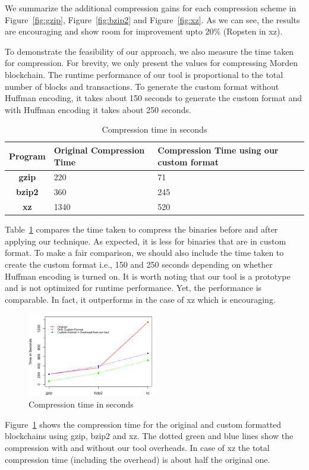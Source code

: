 We summarize the additional compression gains for each compression scheme in Figure~\ref{fig:gzip}, Figure~\ref{fig:bzip2} and Figure~\ref{fig:xz}. 
As we can see, the results are encouraging and show room for improvement upto $20\%$ (Ropsten in xz).

To demonstrate the feasibility of our approach, we also measure the time taken for compression. 
For brevity, we only present the values for compressing Morden blockchain.
The runtime performance of our tool is proportional to the total number of blocks and transactions. 
To generate the custom format without Huffman encoding, it takes about 150 seconds to generate the custom format and with Huffman encoding it takes about 250 seconds. 



\begin{table}[H]
	\centering
	\begin{tabular}{>{\bfseries}c | p{3cm} | p{3cm}} 
	Program & {Original Compression Time} & {Compression Time using our custom format} \\
	\hline
	gzip & 220  & 71 \\
	bzip2 & 360  & 245\\
	xz & 1340 & 520 \\
	\end{tabular}
	\caption{Compression time in seconds}
	\label{tab:comptime}
\end{table}
Table~\ref{tab:comptime} compares the time taken to compress the binaries before and after applying our technique. As expected, it is less for binaries that are in custom format. 
To make a fair comparison, we should also include the time taken to create the custom format i.e., 150 and 250 seconds depending on whether Huffman encoding is turned on.
It is worth noting that our tool is a prototype and is not optimized for runtime performance. 
Yet, the performance is comparable. 
In fact, it outperforms in the case of xz which is encouraging.
\begin{figure}[H]
	\centering
	\includegraphics[width=0.5\textwidth, scale=0.5]{plots/time}
	\caption{Compression time in seconds}
	\label{fig:comptime}
\end{figure}
Figure~\ref{fig:comptime} shows the compression time for the original and custom formatted blockchains using gzip, bzip2 and xz.
The dotted green and blue lines show the compression with and without our tool
overheads. In case of xz the total compression time (including the overhead) is about half the original one.

